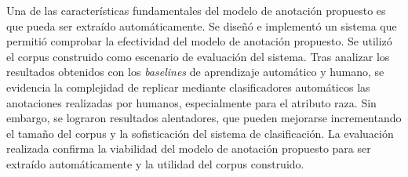 \begin{conclusions}
    Una de las caracter\'isticas fundamentales del modelo de anotaci\'on propuesto es que pueda ser extra\'ido 
    autom\'aticamente. Se dise\~n\'o e implement\'o un sistema que permiti\'o comprobar la efectividad del modelo 
    de anotaci\'on propuesto. Se utiliz\'o el corpus construido como escenario de evaluaci\'on del sistema. 
    Tras analizar los resultados obtenidos con los \emph{baselines} de aprendizaje autom\'atico y humano, se 
    evidencia la complejidad de replicar mediante clasificadores autom\'aticos las anotaciones realizadas por 
    humanos, especialmente para el atributo raza. Sin embargo, se lograron resultados alentadores, que pueden 
    mejorarse incrementando el tama\~no del corpus y la sofisticaci\'on del sistema de clasificaci\'on. La 
    evaluaci\'on realizada confirma la viabilidad del modelo de anotaci\'on propuesto para ser extra\'ido 
    autom\'aticamente y la utilidad del corpus construido.


\end{conclusions}
